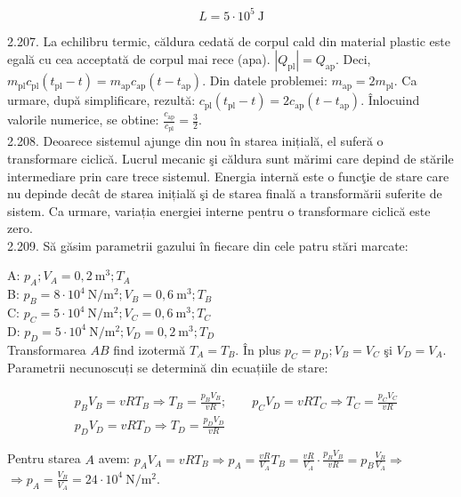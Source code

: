 \documentclass[10pt]{article}
\begin{document}
$$
L=5 \cdot 10^{5} \mathrm{~J}
$$

2.207. La echilibru termic, căldura cedată de corpul cald din material plastic este egală cu cea acceptată de corpul mai rece (apa). $\left|Q_{\mathrm{pl}}\right|=Q_{\mathrm{ap}}$. Deci, $m_{\mathrm{pl}} c_{\mathrm{pl}}\left(t_{\mathrm{pl}}-t\right)=m_{\mathrm{ap}} c_{\mathrm{ap}}\left(t-t_{\mathrm{ap}}\right)$. Din datele problemei: $m_{\mathrm{ap}}=2 m_{\mathrm{pl}}$. Ca urmare, după simplificare, rezultă: $c_{\mathrm{pl}}\left(t_{\mathrm{pl}}-t\right)=2 c_{\mathrm{ap}}\left(t-t_{\mathrm{ap}}\right)$. Înlocuind valorile numerice, se obtine: $\frac{c_{\mathrm{ap}}}{c_{\mathrm{pl}}}=\frac{3}{2}$.\\
2.208. Deoarece sistemul ajunge din nou în starea inițială, el suferă o transformare ciclică. Lucrul mecanic şi căldura sunt mărimi care depind de stările intermediare prin care trece sistemul. Energia internă este o funcţie de stare care nu depinde decât de starea inițială şi de starea finală a transformării suferite de sistem. Ca urmare, variația energiei interne pentru o transformare ciclică este zero.\\
2.209. Să găsim parametrii gazului în fiecare din cele patru stări marcate:

A: $p_{A} ; V_{A}=0,2 \mathrm{~m}^{3} ; T_{A}$\\
B: $p_{B}=8 \cdot 10^{4} \mathrm{~N} / \mathrm{m}^{2} ; V_{B}=0,6 \mathrm{~m}^{3} ; T_{B}$\\
C: $p_{C}=5 \cdot 10^{4} \mathrm{~N} / \mathrm{m}^{2} ; V_{C}=0,6 \mathrm{~m}^{3} ; T_{C}$\\
D: $p_{D}=5 \cdot 10^{4} \mathrm{~N} / \mathrm{m}^{2} ; V_{D}=0,2 \mathrm{~m}^{3} ; T_{D}$\\
Transformarea $A B$ find izotermă $T_{A}=T_{B}$. În plus $p_{C}=p_{D} ; V_{B}=V_{C}$ şi $V_{D}=V_{A}$. Parametrii necunoscuți se determină din ecuațiile de stare:

$$
\begin{aligned}
& p_{B} V_{B}=v R T_{B} \Rightarrow T_{B}=\frac{p_{B} V_{B}}{v R} ; \quad \quad p_{C} V_{D}=v R T_{C} \Rightarrow T_{C}=\frac{p_{C} V_{C}}{v R} \\
& p_{D} V_{D}=v R T_{D} \Rightarrow T_{D}=\frac{p_{D} V_{D}}{v R}
\end{aligned}
$$

Pentru starea $A$ avem: $p_{A} V_{A}=v R T_{B} \Rightarrow p_{A}=\frac{v R}{V_{A}} T_{B}=\frac{v R}{V_{A}} \cdot \frac{p_{B} V_{B}}{v R}=p_{B} \frac{V_{B}}{V_{A}} \Rightarrow$ $\Rightarrow p_{A}=\frac{V_{B}}{V_{A}}=24 \cdot 10^{4} \mathrm{~N} / \mathrm{m}^{2}$.
\end{document}
